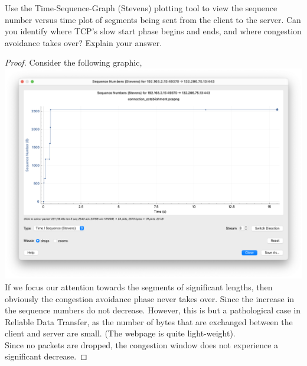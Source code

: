 \documentclass[../main.tex]{subfiles}
\begin{document}
\begin{wts}
    Use the Time-Sequence-Graph (Stevens) plotting tool to view the sequence number versus time plot of segments being sent from the client to the server. Can you identify where TCP’s slow start phase begins and ends, and where congestion avoidance takes over? Explain your answer.
\end{wts}
\begin{proof}
    Consider the following graphic,\\
    \includegraphics[width=\textwidth]{subfiles/images/connection_bytestream_plot_Q19_client_to_server.png}
    If we focus our attention towards the segments of significant lengths, then obviously the congestion avoidance phase never takes over. Since the increase in the sequence numbers do not decrease. However, this is but a pathological case in Reliable Data Transfer, as the number of bytes that are exchanged between the client and server are small. (The webpage is quite light-weight).\\
    
    Since no packets are dropped, the congestion window does not experience a significant decrease.
\end{proof}
\newpage
\end{document}
